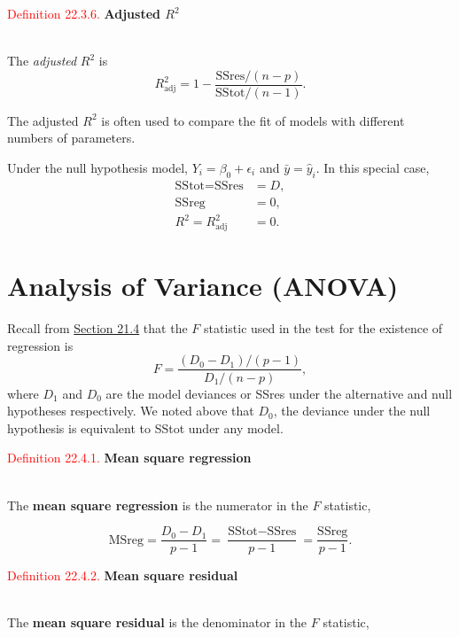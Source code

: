 \documentclass[
]{book}
\begin{document}
\hypertarget{Sec_Linear_ANOVA:def:CoD_adjusted}{}
\textcolor{red}{Definition 22.3.6.}
{\textbf{Adjusted \(R^2\)}}\\
\strut \\
The \emph{adjusted} \(R^2\) is\\

\[R_{\text{adj}}^2 = 1 - \frac{\text{SSres}/(n-p)}{\text{SStot}/(n-1)}.\]

The adjusted \(R^2\) is often used to compare the fit of models with different numbers of parameters.

Under the null hypothesis model, \(Y_i = \beta_0 + \epsilon_i\) and \(\bar{y} = \hat{y}_i\). In this special case,\\

\begin{align*}
\text{SStot} = \text{SSres} &= D, \\
\text{SSreg} &= 0, \\ 
R^2 = R_{\text{adj}}^2 &= 0.
\end{align*}

\hypertarget{Sec_Linear_ANOVA:ANOVA}{%
\section{Analysis of Variance (ANOVA)}\label{Sec_Linear_ANOVA:ANOVA}}

Recall from \protect\hyperlink{Sec_Linear_hypo_test:F}{Section 21.4} that the \(F\) statistic used in the test for the existence of regression is
\[F = \frac{(D_0 - D_1)/(p-1)}{D_1/(n-p)},\]
where \(D_1\) and \(D_0\) are the model deviances or SSres under the alternative and null hypotheses respectively. We noted above that \(D_0\), the deviance under the null hypothesis is equivalent to SStot under any model.

\hypertarget{Sec_Linear_ANOVA:def:MSreg}{}
\textcolor{red}{Definition 22.4.1.}
{\textbf{Mean square regression}}\\
\strut \\
The {\textbf{mean square regression}} is the numerator in the \(F\) statistic,

\[\text{MSreg} = \frac{D_0 - D_1}{p-1} = \frac{\text{SStot} - \text{SSres}}{p-1} = \frac{\text{SSreg}}{p-1}.\]

\hypertarget{Sec_Linear_ANOVA:def:MSreg}{}
\textcolor{red}{Definition 22.4.2.}
{\textbf{Mean square residual}}\\
\strut \\
The {\textbf{mean square residual}} is the denominator in the \(F\) statistic,
\end{document}
